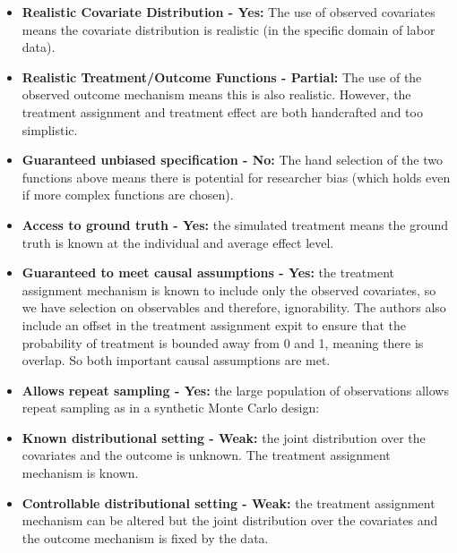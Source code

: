 \documentclass[../main.tex]{subfiles}
\begin{document}
\vspace{\baselineskip}
\begin{itemize}
    \item \textbf{Realistic Covariate Distribution - Yes: }The use of observed covariates means the covariate distribution is realistic (in the specific domain of labor data).\par


\vspace{\baselineskip}
    \item \textbf{Realistic Treatment/Outcome Functions - Partial: }The use of the observed outcome mechanism means this is also realistic. However, the treatment assignment and treatment effect are both handcrafted and too simplistic.\par


\vspace{\baselineskip}
    \item \textbf{Guaranteed unbiased specification - No: }The hand selection of the two functions above means there is potential for researcher bias (which holds even if more complex functions are chosen).\par


\vspace{\baselineskip}
    \item \textbf{Access to ground truth - Yes: }the simulated treatment means the ground truth is known at the individual and average effect level.\par


\vspace{\baselineskip}
    \item \textbf{Guaranteed to meet causal assumptions - Yes: }the treatment assignment mechanism is known to include only the observed covariates, so we have selection on observables and therefore, ignorability. The authors also include an offset in the treatment assignment expit to ensure that the probability of treatment is bounded away from 0 and 1, meaning there is overlap. So both important causal assumptions are met.\par


\vspace{\baselineskip}
    \item \textbf{Allows repeat sampling - Yes: }the large population of observations allows repeat sampling as in a synthetic Monte Carlo design:\par


\vspace{\baselineskip}
    \item \textbf{Known distributional setting - Weak: }the joint distribution over the covariates and the outcome is unknown. The treatment assignment mechanism is known.\par


\vspace{\baselineskip}
    \item \textbf{Controllable distributional setting - Weak: }the treatment assignment mechanism can be altered but the joint distribution over the covariates and the outcome mechanism is fixed by the data.
\end{itemize}\par
\end{document}

